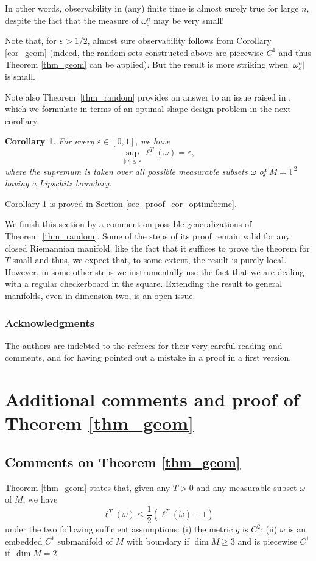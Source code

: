 \documentclass[10pt]{amsart}
\newtheorem{corollary}{Corollary}
\theoremstyle{definition}
\begin{document}
In other words, observability in (any) finite time is almost surely true for large $n$, despite the fact that the measure of $\omega_\varepsilon^n$ may be very small!

Note that, for $\varepsilon>1/2$, almost sure observability follows from Corollary \ref{cor_geom} (indeed, the random sets constructed above are piecewise $C^1$ and thus Theorem \ref{thm_geom} can be applied). But the result is more striking when $\vert\omega_\varepsilon^n\vert$ is small.

Note also Theorem~\ref{thm_random} provides an answer to an issue raised in \cite{HebrardHumbert}, which we formulate in terms of an optimal shape design problem in the next corollary.

\begin{corollary}\label{cor_optimforme}
For every $\varepsilon \in [0,1]$, we have
\[
\displaystyle\sup_{|\omega| \leq \varepsilon} \ell^T(\omega)= \varepsilon,
\]
where the supremum is taken over all possible measurable subsets $\omega$ of $M=\mathbb{T}^2$ having a Lipschitz boundary.
\end{corollary}

Corollary \ref{cor_optimforme} is proved in Section \ref{sec_proof_cor_optimforme}.

We finish this section by a comment on possible generalizations of Theorem~\ref{thm_random}. Some of the steps of its proof remain valid for any closed Riemannian manifold, like the fact that it suffices to prove the theorem for $T$ small and thus, we expect that, to some extent, the result is purely local. However, in some other steps we instrumentally use the fact that we are dealing with a regular checkerboard in the square.
Extending the result to general manifolds, even in dimension two, is an open issue.

\subsubsection*{Acknowledgments}
The authors are indebted to the referees for their very careful reading and comments, and for having pointed out a mistake in a proof in a first version.

\section{Additional comments and proof of Theorem \ref{thm_geom}}\label{sec_geom}
\subsection{Comments on Theorem \ref{thm_geom}}
Theorem \ref{thm_geom} states that, given any $T>0$ and any measurable subset $\omega$ of $M$, we have
\[
\ell^T(\overline\omega) \leq \frac{1}{2} \left( \ell^T(\mathring{\omega}) + 1 \right)
\]
under the two following sufficient assumptions: (i) the metric $g$ is $C^2$; (ii) $\omega$ is an embedded $C^1$ submanifold of $M$ with boundary if $\dim M \geq 3$ and is piecewise $C^1$ if~$\dim M=2$.
\end{document}
